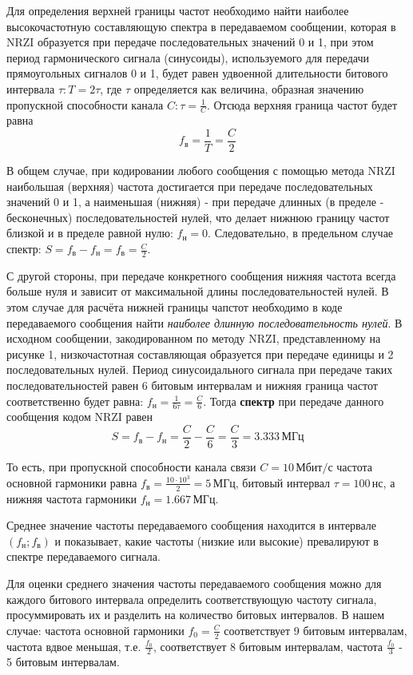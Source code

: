 Для определения верхней границы частот необходимо найти наиболее высокочастотную составляющую спектра в передаваемом сообщении, которая в NRZI образуется при передаче последовательных значений 0 и 1, при этом период гармонического сигнала (синусоиды), используемого для передачи прямоугольных сигналов 0 и 1, будет равен удвоенной длительности битового интервала $\tau: T = 2\tau$, где $\tau$ определяется как величина, образная значению пропускной способности канала $C: \tau = \frac{1}{C}$. Отсюда верхняя граница частот будет равна \[f_{\text{в}} = \frac{1}{T} = \frac{C}{2}\]

В общем случае, при кодировании любого сообщения с помощью метода NRZI наибольшая (верхняя) частота достигается при передаче последовательных значений 0 и 1, а наименьшая (нижняя) - при передаче длинных (в пределе - бесконечных) последовательностей нулей, что делает нижнюю границу частот близкой и в пределе равной нулю: $f_{\text{н}} = 0$. Следовательно, в предельном случае спектр: $S = f_{\text{в}} - f_{\text{н}} = f_{\text{в}} = \frac{C}{2}$.

С другой стороны, при передаче конкретного сообщения нижняя частота всегда больше нуля и зависит от максимальной длины последовательностей нулей. В этом случае для расчёта нижней границы чапстот необходимо в коде передаваемого сообщения найти \textit{наиболее длинную последовательность нулей}. В исходном сообщении, закодированном по методу NRZI, представленному на рисунке 1, низкочастотная составляющая образуется при передаче единицы и 2 последовательных нулей. Период синусоидального сигнала при передаче таких последовательностей равен 6 битовым интервалам и нижняя граница частот соответственно будет равна: $f_{\text{н}} = \frac{1}{6\tau} = \frac{C}{6}$. Тогда \textbf{спектр} при передаче данного сообщения кодом NRZI равен
\[
	S =  f_{\text{в}} - f_{\text{н}} = \frac{C}{2} - \frac{C}{6} = \frac{C}{3} = 3.333 \, \text{МГц}
\]

То есть, при пропускной способности канала связи $C = 10 \, \text{Мбит/с}$ частота основной гармоники равна $f_{\text{в}} = \frac{10 \cdot 10^3}{2} = 5 \, \text{МГц}$, битовый интервал $\tau = 100 \, \text{нс}$, а нижняя частота гармоники $f_{\text{н}} = 1.667 \, \text{МГц}$.

Среднее значение частоты передаваемого сообщения находится в интервале $(f_{\text{н}};f_{\text{в}})$ и показывает, какие частоты (низкие или высокие) превалируют в спектре передаваемого сигнала.

Для оценки среднего значения частоты передаваемого сообщения можно для каждого битового интервала определить соответствующую частоту сигнала, просуммировать их и разделить на количество битовых интервалов. В нашем случае: частота основной гармоники $f_0 = \frac{C}{2}$ соответствует 9 битовым интервалам, частота вдвое меньшая, т.е. $\frac{f_0}{2}$, соответствует 8 битовым интервалам, частота $\frac{f_0}{3}$ - 5 битовым интервалам.

